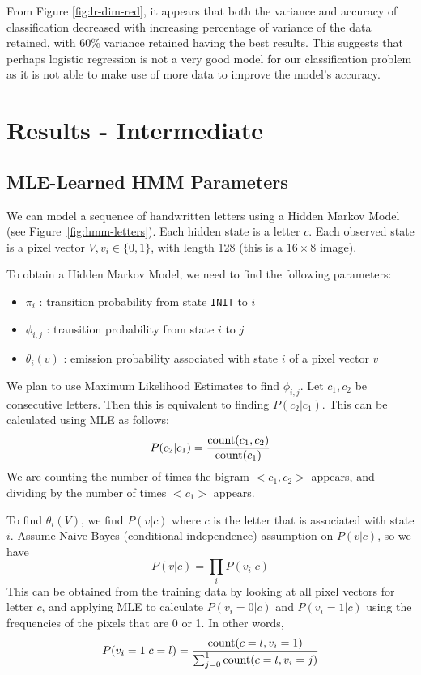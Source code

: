 \documentclass{article} %
\begin{document}
From Figure \ref{fig:lr-dim-red}, it appears that both the variance and accuracy of classification decreased with increasing percentage of variance of the data retained, with 60\% variance retained having the best results. This suggests that perhaps logistic regression is not a very good model for our classification problem as it is not able to make use of more data to improve the model's accuracy.

\section{Results - Intermediate}

\subsection{MLE-Learned HMM Parameters}

We can model a sequence of handwritten letters using a Hidden Markov Model (see Figure~\ref{fig:hmm-letters}). Each hidden state is a letter $c$. Each observed state is a pixel vector $V, v_i \in \{0,1\}$, with length 128 (this is a $16 \times 8$ image). 

To obtain a Hidden Markov Model, we need to find the following parameters:
\begin{itemize}
	\item $\pi_i$ : transition probability from state \texttt{INIT} to $i$
	\item $\phi_{i,j}$ : transition probability from state $i$ to $j$
	\item $\theta_{i}(v)$ : emission probability associated with state $i$ of a pixel vector $v$
\end{itemize}

We plan to use Maximum Likelihood Estimates to find $\phi_{i,j}$. Let $c_1, c_2$ be consecutive letters. Then this is equivalent to finding $P(c_2 | c_1)$. This can be calculated using MLE as follows:
$$ P(c_2 | c_1) = \frac{\mbox{count}(c_1, c_2)}{\mbox{count}(c_1)}$$
We are counting the number of times the bigram $<c_1, c_2>$ appears, and dividing by the number of times $<c_1>$ appears.

To find $\theta_{i}(V)$, we find $P(v | c)$ where $c$ is the letter that is associated with state $i$. Assume Naive Bayes (conditional independence) assumption on $P(v | c)$, so we have 
$$ P(v | c) = \prod_i P(v_i | c)$$
This can be obtained from the training data by looking at all pixel vectors for letter $c$, and applying MLE to calculate $P(v_i = 0 | c)$ and $P(v_i = 1 | c)$ using the frequencies of the pixels that are 0 or 1. In other words,
$$ P(v_i = 1 | c = l) = \frac{\mbox{count}(c = l, v_i = 1)}{\sum_{j=0}^1 \mbox{count}(c = l, v_i = j)}$$
\end{document}
